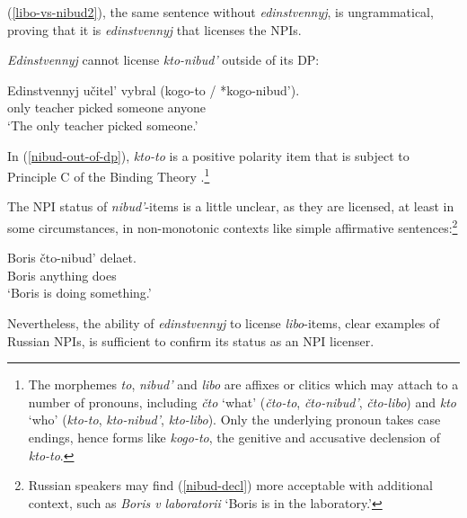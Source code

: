 (\ref{libo-vs-nibud2}), the same sentence without \textit{edinstvennyj}, is ungrammatical, proving that it is \textit{edinstvennyj} that licenses the NPIs.

\begin{exe}
\end{exe}

\textit{Edinstvennyj} cannot license \textit{kto-nibud'} outside of its DP:

\begin{exe}
	\ex \label{nibud-out-of-dp} \gll Edinstvennyj u\v{c}itel' vybral (kogo-to / *kogo-nibud').\\
	only teacher picked someone {} anyone\\
	\glt `The only teacher picked someone.'
\end{exe}

In (\ref{nibud-out-of-dp}), \textit{kto-to}	is a positive polarity item that is subject to Principle C of the Binding Theory \citep{russneg}.\footnote{The morphemes \textit{to}, \textit{nibud'} and \textit{libo} are affixes or clitics which may attach to a number of pronouns, including \textit{\v{c}to} `what' (\textit{\v{c}to-to}, \textit{\v{c}to-nibud'}, \textit{\v{c}to-libo}) and \textit{kto} `who' (\textit{kto-to}, \textit{kto-nibud'}, \textit{kto-libo}). Only the underlying pronoun takes case endings, hence forms like \textit{kogo-to}, the genitive and accusative declension of \textit{kto-to}.}

The NPI status of \textit{nibud'}-items is a little unclear, as they are licensed, at least in some circumstances, in non-monotonic contexts like simple affirmative sentences:\footnote{Russian speakers may find (\ref{nibud-decl}) more acceptable with additional context, such as \textit{Boris v laboratorii} `Boris is in the laboratory.'}

\begin{exe}
	\ex \label{nibud-decl} \gll Boris \v{c}to-nibud' delaet.\\
	Boris anything does\\
	\glt `Boris is doing something.'
\end{exe}

Nevertheless, the ability of \textit{edinstvennyj} to license \textit{libo}-items, clear examples of Russian NPIs, is sufficient to confirm its status as an NPI licenser.

